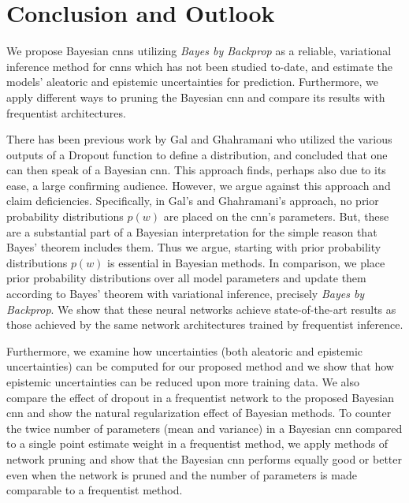 \chapter{Conclusion and Outlook}

We propose Bayesian \acp{cnn} utilizing \textit{Bayes by Backprop} as a reliable, variational inference method for \acp{cnn} which has not been studied to-date, and estimate the models' aleatoric and epistemic uncertainties for prediction. Furthermore, we apply different ways to pruning the Bayesian \ac{cnn} and compare its results with frequentist architectures.


\newline There has been previous work by Gal and Ghahramani \cite{gal2015bayesian} who utilized the various outputs of a Dropout function to define a distribution, and concluded that one can then speak of a Bayesian \ac{cnn}. This approach finds, perhaps also due to its ease, a large confirming audience. However, we argue against this approach and claim deficiencies. Specifically, in Gal's and Ghahramani's \cite{gal2015bayesian} approach, no prior probability distributions $p(w)$ are placed on the \ac{cnn}'s parameters. But, these are a substantial part of a Bayesian interpretation for the simple reason that Bayes' theorem includes them. Thus we argue, starting with prior probability distributions $p(w)$ is essential in Bayesian methods. In comparison, we place prior probability distributions over all model parameters and update them according to Bayes' theorem with variational inference, precisely \textit{Bayes by Backprop}. We show that these neural networks achieve state-of-the-art results as those achieved by the same network architectures trained by frequentist inference. 


\newline Furthermore, we examine how uncertainties (both aleatoric and epistemic uncertainties) can be computed for our proposed method and we show that how epistemic uncertainties can be reduced upon more training data. We also compare the effect of dropout in a frequentist network to the proposed Bayesian \ac{cnn} and show the natural regularization effect of Bayesian methods. To counter the twice number of parameters (mean and variance) in a Bayesian \ac{cnn} compared to a single point estimate weight in a frequentist method, we apply methods of network pruning and show that the Bayesian \ac{cnn} performs equally good or better even when the network is pruned and the number of parameters is made comparable to a frequentist method. 


